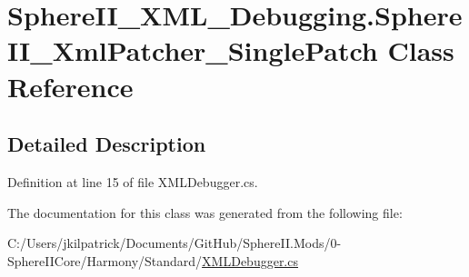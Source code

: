 \hypertarget{class_sphere_i_i___x_m_l___debugging_1_1_sphere_i_i___xml_patcher___single_patch}{}\section{Sphere\+I\+I\+\_\+\+X\+M\+L\+\_\+\+Debugging.\+Sphere\+I\+I\+\_\+\+Xml\+Patcher\+\_\+\+Single\+Patch Class Reference}
\label{class_sphere_i_i___x_m_l___debugging_1_1_sphere_i_i___xml_patcher___single_patch}


\subsection{Detailed Description}


Definition at line 15 of file X\+M\+L\+Debugger.\+cs.



The documentation for this class was generated from the following file\+:\begin{DoxyCompactItemize}
\item 
C\+:/\+Users/jkilpatrick/\+Documents/\+Git\+Hub/\+Sphere\+I\+I.\+Mods/0-\/\+Sphere\+I\+I\+Core/\+Harmony/\+Standard/\mbox{\hyperlink{_x_m_l_debugger_8cs}{X\+M\+L\+Debugger.\+cs}}\end{DoxyCompactItemize}
